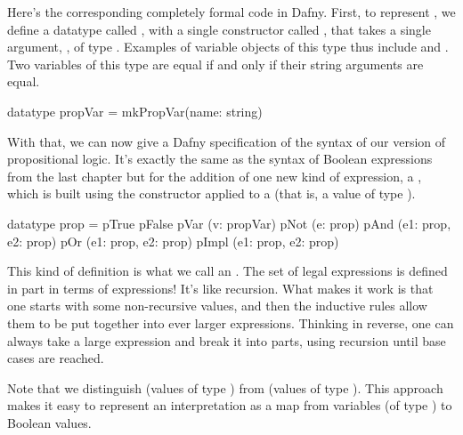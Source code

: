 \documentclass[letterpaper,10pt,english]{sphinxmanual}
\begin{document}
Here’s the corresponding completely formal code in Dafny. First, to
represent , we define a datatype called , with a
single constructor called , that takes a single argument,
, of type .  Examples of variable objects of this type
thus include  and . Two variables of
this type are equal if and only if their string arguments are equal.

\begin{sphinxVerbatim}[commandchars=\\\{\}]
datatype propVar = mkPropVar(name: string)
\end{sphinxVerbatim}

With that, we can now give a Dafny specification of the syntax of our
version of propositional logic. It’s exactly the same as the syntax of
Boolean expressions from the last chapter but for the addition of one
new kind of expression, a , which is built using
the  constructor applied to a  (that is, a value of
type ).

\begin{sphinxVerbatim}[commandchars=\\\{\}]
datatype prop =
   pTrue \textbar{}
   pFalse \textbar{}
   pVar (v: propVar) \textbar{}
   pNot (e: prop) \textbar{}
   pAnd (e1: prop, e2: prop) \textbar{}
   pOr (e1: prop, e2: prop) \textbar{}
   pImpl (e1: prop, e2: prop)
\end{sphinxVerbatim}

This kind of definition is what we call an . The
set of legal expressions is defined in part in terms of expressions!
It’s like recursion. What makes it work is that one starts with some
non-recursive  values, and then the inductive rules allow them
to be put together into ever larger expressions. Thinking in reverse,
one can always take a large expression and break it into parts, using
recursion until base cases are reached.

Note that we distinguish  (values of type ) from
 (values of type ). This approach makes it
easy to represent an interpretation as a map from variables (of type
) to Boolean values.
\end{document}
